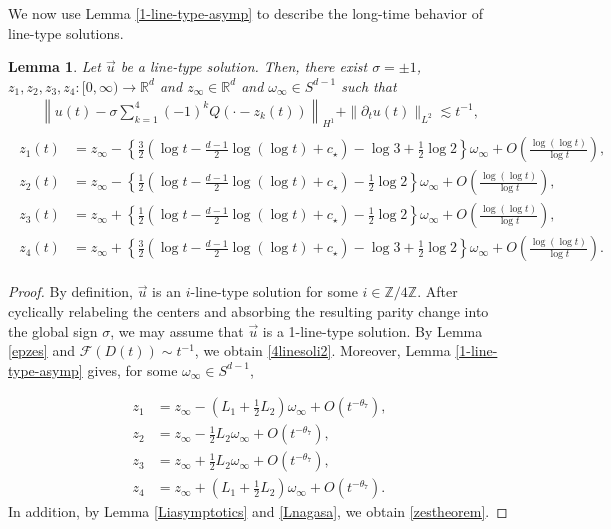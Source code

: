 \documentclass[10pt,a4paper]{amsart}
\newtheorem{lemma}[theorem]{Lemma}
\numberwithin{equation}{section}
\begin{document}
We now use Lemma \ref{1-line-type-asymp} to describe the long-time behavior of line-type solutions.
\begin{lemma}\label{1-linekansei}
Let $\vec{u}$ be a line-type solution. Then, there exist $\sigma=\pm 1$, $z_1,z_2,z_3,z_4:[0,\infty)\to\mathbb{R}^d$ and $z_{\infty}\in\mathbb{R}^d$ and $\omega_{\infty}\in S^{d-1}$ such that 
\begin{align}\label{4linesoli2}
\left\| u(t)-\sigma \sum_{k=1}^4 (-1)^kQ(\cdot-z_k(t))\right\|_{H^1}+\|{\partial}_tu(t)\|_{L^2}\lesssim t^{-1},
\end{align}
\begin{align}\label{zestheorem}
\begin{aligned}
z_1(t)&=z_{\infty}-\left\{\frac{3}{2}\left(\log{t}-\frac{d-1}{2}\log{(\log{t})}+c_{\star}\right)-\log{3}+\frac{1}{2}\log{2} \right\}\omega_{\infty}+O\left(\frac{\log{(\log{t})}}{\log{t}}\right),
\\
z_2(t)&=z_{\infty}-\left\{\frac{1}{2}\left(\log{t}-\frac{d-1}{2}\log{(\log{t})}+c_{\star}\right)-\frac{1}{2}\log{2} \right\}\omega_{\infty}+O\left(\frac{\log{(\log{t})}}{\log{t}}\right),
\\
z_3(t)&=z_{\infty}+\left\{\frac{1}{2}\left(\log{t}-\frac{d-1}{2}\log{(\log{t})}+c_{\star}\right)-\frac{1}{2}\log{2} \right\}\omega_{\infty}+O\left(\frac{\log{(\log{t})}}{\log{t}}\right),
\\
z_4(t)&=z_{\infty}+\left\{\frac{3}{2}\left(\log{t}-\frac{d-1}{2}\log{(\log{t})}+c_{\star}\right)-\log{3}+\frac{1}{2}\log{2} \right\}\omega_{\infty}+O\left(\frac{\log{(\log{t})}}{\log{t}}\right).
\end{aligned}
\end{align}
\end{lemma}

\begin{proof}
By definition, $\vec{u}$ is an $i$-line-type solution for some $i\in\mathbb{Z}/4\mathbb{Z}$. After cyclically relabeling the centers and absorbing the resulting parity change into the global sign $\sigma$, we may assume that $\vec{u}$ is a 1-line-type solution. By Lemma \ref{epzes} and $\mathcal{F}(D(t))\sim t^{-1}$, we obtain \eqref{4linesoli2}. Moreover, Lemma \ref{1-line-type-asymp} gives, for some $\omega_\infty\in S^{d-1}$,

\begin{align*}
z_1&=z_\infty-\left(L_1+\frac{1}{2}L_2\right)\omega_\infty+O(t^{-\theta_7}),
\\
z_2&=z_\infty-\frac{1}{2}L_2\omega_\infty+O(t^{-\theta_7}),
\\
z_3&=z_\infty+\frac{1}{2}L_2\omega_\infty+O(t^{-\theta_7}),
\\
z_4&=z_\infty+\left(L_1+\frac{1}{2}L_2\right)\omega_\infty+O(t^{-\theta_7}).
\end{align*}
In addition, by Lemma \ref{Liasymptotics} and \eqref{Lnagasa}, we obtain \eqref{zestheorem}.

\end{proof}
\end{document}
